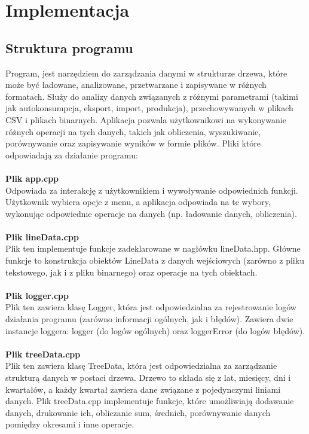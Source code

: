 \newpage
\section{Implementacja}		%
\subsection{Struktura programu}
Program, jest narzędziem do zarządzania danymi w strukturze drzewa, które może być ładowane, analizowane, przetwarzane i zapisywane w różnych formatach. Służy do analizy danych związanych z różnymi parametrami (takimi jak autokonsumpcja, eksport, import, produkcja), przechowywanych w plikach CSV i plikach binarnych. Aplikacja pozwala użytkownikowi na wykonywanie różnych operacji na tych danych, takich jak obliczenia, wyszukiwanie, porównywanie oraz zapisywanie wyników w formie plików. Pliki które odpowiadają za działanie programu:
\\ \\
\textbf{Plik app.cpp}
\\
Odpowiada za interakcję z użytkownikiem i wywoływanie odpowiednich funkcji. Użytkownik wybiera opcje z menu, a aplikacja odpowiada na te wybory, wykonując odpowiednie operacje na danych (np. ładowanie danych, obliczenia).
\\ \\
\textbf{Plik lineData.cpp}
\\
Plik ten implementuje funkcje zadeklarowane w nagłówku lineData.hpp. Główne funkcje to konstrukcja obiektów LineData z danych wejściowych (zarówno z pliku tekstowego, jak i z pliku binarnego) oraz operacje na tych obiektach.
\\ \\
\textbf{Plik logger.cpp}
\\
Plik ten zawiera klasę Logger, która jest odpowiedzialna za rejestrowanie logów działania programu (zarówno informacji ogólnych, jak i błędów). Zawiera dwie instancje loggera: logger (do logów ogólnych) oraz loggerError (do logów błędów).
\\ \\
\textbf{Plik treeData.cpp}
\\
Plik ten zawiera klasę TreeData, która jest odpowiedzialna za zarządzanie strukturą danych w postaci drzewa. Drzewo to składa się z lat, miesięcy, dni i kwartałów, a każdy kwartał zawiera dane związane z pojedynczymi liniami danych. Plik treeData.cpp implementuje funkcje, które umożliwiają dodawanie danych, drukowanie ich, obliczanie sum, średnich, porównywanie danych pomiędzy okresami i inne operacje.
\\
\newpage
